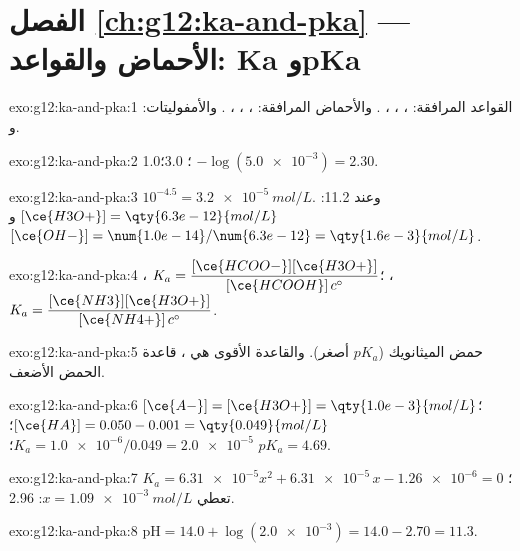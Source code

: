 \section*{الفصل \ref{ch:g12:ka-and-pka} --- الأحماض والقواعد: Ka وpKa}

\begin{solution}{exo:g12:ka-and-pka:1}
القواعد المرافقة: ، ، ، . والأحماض
المرافقة: ، ، ، . والأمفوليتات: 
و.
\end{solution}

\begin{solution}{exo:g12:ka-and-pka:2}
 1.0؛ 3.0؛ $-\log(\num{5.0e-3}) = 2.30$.
\end{solution}

\begin{solution}{exo:g12:ka-and-pka:3}
$10^{-4.5} = \qty{3.2e-5}{mol/L}$. وعند  11.2:
$[\ce{H3O+}] = \qty{6.3e-12}{mol/L}$
و$[\ce{OH-}] = \num{1.0e-14}/\num{6.3e-12} = \qty{1.6e-3}{mol/L}$.
\end{solution}

\begin{solution}{exo:g12:ka-and-pka:4}
،
$K_a = \dfrac{[\ce{HCOO-}][\ce{H3O+}]}{[\ce{HCOOH}]\,c^\circ}$؛
،
$K_a = \dfrac{[\ce{NH3}][\ce{H3O+}]}{[\ce{NH4+}]\,c^\circ}$.
\end{solution}

\begin{solution}{exo:g12:ka-and-pka:5}
حمض الميثانويك ($pK_a$ أصغر). والقاعدة الأقوى هي ،
قاعدة الحمض الأضعف.
\end{solution}

\begin{solution}{exo:g12:ka-and-pka:6}
$[\ce{A-}] = [\ce{H3O+}] = \qty{1.0e-3}{mol/L}$؛
$[\ce{HA}] = 0.050 - 0.001 = \qty{0.049}{mol/L}$؛
$K_a = \num{1.0e-6}/0.049 = \num{2.0e-5}$؛ $pK_a = 4.69$.
\end{solution}

\begin{solution}{exo:g12:ka-and-pka:7}
$K_a = \num{6.31e-5}$؛ $x^2 + \num{6.31e-5}\,x - \num{1.26e-6} = 0$ تعطي
$x = \qty{1.09e-3}{mol/L}$:  2.96.
\end{solution}

\begin{solution}{exo:g12:ka-and-pka:8}
$\mathrm{pH} = 14.0 + \log(\num{2.0e-3}) = 14.0 - 2.70 = 11.3$.
\end{solution}


